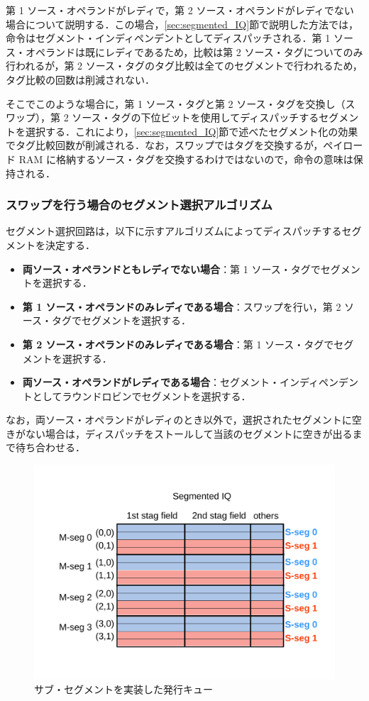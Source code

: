 \documentclass[submit,techrep,noauthor]{ipsj}
\begin{document}
第 1 ソース・オペランドがレディで，第 2 ソース・オペランドがレディでない場合について説明する．この場合，\ref{sec:segmented_IQ}節で説明した方法では，命令はセグメント・インディペンデントとしてディスパッチされる．第 1 ソース・オペランドは既にレディであるため，比較は第 2 ソース・タグについてのみ行われるが，第 2  ソース・タグのタグ比較は全てのセグメントで行われるため，タグ比較の回数は削減されない．

そこでこのような場合に，第 1 ソース・タグと第 2 ソース・タグを交換し（スワップ），第 2 ソース・タグの下位ビットを使用してディスパッチするセグメントを選択する．これにより，\ref{sec:segmented_IQ}節で述べたセグメント化の効果でタグ比較回数が削減される．なお，スワップではタグを交換するが，ペイロード RAM に格納するソース・タグを交換するわけではないので，命令の意味は保持される．

\subsubsection{スワップを行う場合のセグメント選択アルゴリズム}
セグメント選択回路は，以下に示すアルゴリズムによってディスパッチするセグメントを決定する．
\begin{itemize}
  \item \textbf{両ソース・オペランドともレディでない場合}：第 1 ソース・タグでセグメントを選択する．
  \item \textbf{第 1 ソース・オペランドのみレディである場合}：スワップを行い，第 2 ソース・タグでセグメントを選択する．
  \item \textbf{第 2 ソース・オペランドのみレディである場合}：第 1 ソース・タグでセグメントを選択する．
  \item \textbf{両ソース・オペランドがレディである場合}：セグメント・インディペンデントとしてラウンドロビンでセグメントを選択する．
\end{itemize}
なお，両ソース・オペランドがレディのとき以外で，選択されたセグメントに空きがない場合は，ディスパッチをストールして当該のセグメントに空きが出るまで待ち合わせる．

\begin{figure}[htb]
  \centering
  \includegraphics[keepaspectratio, scale=.8]{sub_segment.pdf}
  \caption{サブ・セグメントを実装した発行キュー}
  \label{fig:sub_segment}
\end{figure}
\end{document}
